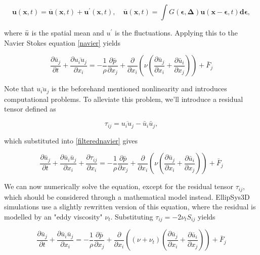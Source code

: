 \begin{equation}
    \boldsymbol{u}(\boldsymbol{x}, t)=\overline{\boldsymbol{u}}(\boldsymbol{x}, t)+\boldsymbol{u}^{\prime}(\boldsymbol{x}, t), \quad \overline{\boldsymbol{u}}(\boldsymbol{x}, t)=\int G(\boldsymbol{\epsilon} , \boldsymbol{\Delta}) \boldsymbol{u}(\boldsymbol{x}-\boldsymbol{\epsilon}, t) \boldsymbol{d} \boldsymbol{\epsilon},
\end{equation}

where $\Bar{u}$ is the spatial mean and $u^\prime$ is the fluctuations. Applying this to the Navier Stokes equation \ref{navier} yields

\begin{equation}
    \frac{\partial \bar{u}_j}{\partial t}+\frac{\partial \overline{u_i u_j}}{\partial x_i}=-\frac{1}{\rho} \frac{\partial \bar{p}}{\partial x_j}+\frac{\partial}{\partial x_i}\left(\nu\left(\frac{\partial \bar{u}_j}{\partial x_i}+\frac{\partial \bar{u}_i}{\partial x_j}\right)\right)+\bar{F}_j
    \label{filterednavier}
\end{equation}

Note that $\overline{u_i u_j}$ is the beforehand mentioned nonlinearity and introduces computational problems. To alleviate this problem, we'll introduce a residual tensor defined as

\begin{equation}
    \tau_{i j}=\overline{u_i u_j}-\bar{u}_i \bar{u}_j,
\end{equation}

which substituted into \ref{filterednavier} gives

\begin{equation}
    \frac{\partial \bar{u}_j}{\partial t}+\frac{\partial \bar{u}_i \bar{u}_j}{\partial x_i}+\frac{\partial \tau_{i j}}{\partial x_i}=-\frac{1}{\rho} \frac{\partial \bar{p}}{\partial x_j}+\frac{\partial}{\partial x_i}\left(\nu\left(\frac{\partial \bar{u}_j}{\partial x_i}+\frac{\partial \bar{u}_i}{\partial x_j}\right)\right)+\bar{F}_j
\end{equation}

We can now numerically solve the equation, except for the residual tensor $\tau_{i j}$, which should be considered through a mathematical model instead. EllipSys3D simulations use a slightly rewritten version of this equation, where the residual is modelled by an "eddy viscosity" $\nu_t$. Substituting $\tau_{ij}=-2\nu_t S_{ij}$ yields

\begin{equation}
\frac{\partial \bar{u}_j}{\partial t}+\frac{\partial \bar{u}_i \bar{u}_j}{\partial x_i}=-\frac{1}{\rho} \frac{\partial \bar{p}}{\partial x_j}+\frac{\partial}{\partial x_i}\left(\left(\nu+\nu_t\right)\left(\frac{\partial \bar{u}_j}{\partial x_i}+\frac{\partial \bar{u}_i}{\partial x_j}\right)\right)+\bar{F}_j
\end{equation}

